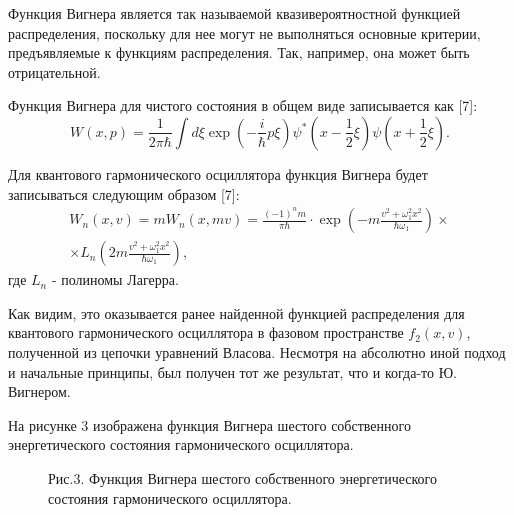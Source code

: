 \documentclass[a4paper,14pt]{article}
\begin{document}
Функция Вигнера является так называемой квазивероятностной функцией распределения, поскольку для нее могут не выполняться основные критерии, предъявляемые к функциям распределения. Так, например, она может быть отрицательной.

Функция Вигнера для чистого состояния в общем виде записывается как [7]:
\begin{equation}
W(x, p)=\frac{1}{2 \pi \hbar} \int d \xi \exp \left(-\frac{i}{\hbar} p \xi\right) \psi^{*}\left(x-\frac{1}{2} \xi\right) \psi\left(x+\frac{1}{2} \xi\right).
\end{equation}

Для квантового гармонического осциллятора функция Вигнера будет записываться следующим образом [7]:
\begin{eqnarray}
W_n(x, v)=m W_n(x, m v)=\frac{(-1)^{n} m}{\pi \hbar} \cdot \exp \left({-m \frac{v^{2}+\omega_1^{2} x^{2}}{\hbar \omega_{1}}}\right) \times \nonumber\\ \times L_{n}\left(2 m \frac{v^{2}+\omega_{1}^{2} x^{2}}{\hbar \omega_{1}}\right),
\end{eqnarray}
где $L_n$ - полиномы Лагерра.

Как видим, это оказывается ранее найденной функцией распределения для квантового гармонического осциллятора в фазовом пространстве $f_2(x,v)$, полученной из цепочки уравнений Власова. Несмотря на абсолютно иной подход и начальные принципы, был получен  тот же результат, что и когда-то Ю. Вигнером.

На рисунке 3 изображена функция Вигнера шестого собственного энергетического состояния гармонического осциллятора.
\begin{figure}[H]
	\caption*{Рис.3. Функция Вигнера шестого собственного энергетического состояния гармонического осциллятора.}
	\label{fig:image}
\end{figure}
\end{document}
